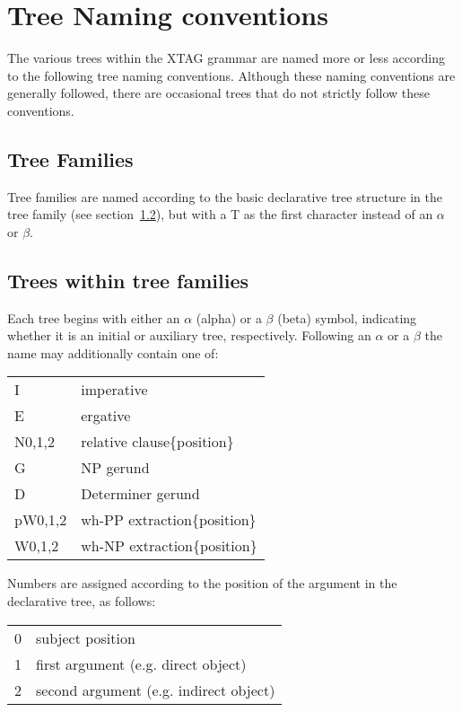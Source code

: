\chapter{Tree Naming conventions}
\label{tree-naming}

The various trees within the XTAG grammar are named more or less according to
the following tree naming conventions.  Although these naming conventions are
generally followed, there are occasional trees that do not strictly follow
these conventions.

\section{Tree Families}
Tree families are named according to the basic declarative tree structure in
the tree family (see section~\ref{family-trees}), but with a T as the first
character instead of an $\alpha$ or $\beta$.

\section{Trees within tree families}
\label{family-trees}

Each tree begins with either an $\alpha$ (alpha) or a $\beta$ (beta) symbol,
indicating whether it is an initial or auxiliary tree, respectively.  Following
an $\alpha$ or a $\beta$ the name may additionally contain one of:

\begin{description}
\item\begin{tabular}{ll}
I&imperative\\
E&ergative\\
N{0,1,2}&relative clause\{position\}\\
G&NP gerund\\
D&Determiner gerund\\
pW{0,1,2}&wh-PP extraction\{position\}\\
W{0,1,2}&wh-NP extraction\{position\}\\
\end{tabular}
\end{description}

\noindent Numbers are assigned according to the position of the argument in the
declarative tree, as follows:

\begin{description}
\item\begin{tabular}{ll}
0&subject position\\
1&first argument (e.g. direct object)\\
2&second argument (e.g. indirect object)\\
\end{tabular}
\end{description}

